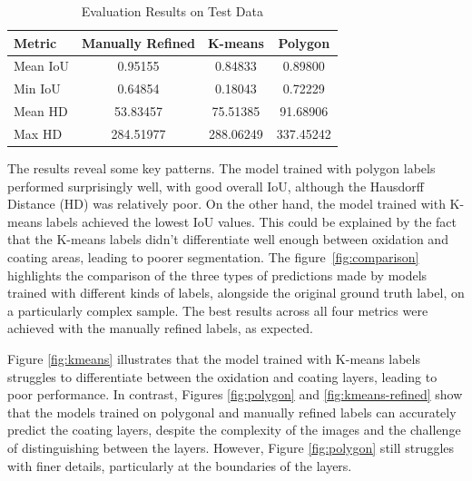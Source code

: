 \begin{table}[H]
    \centering
    \caption{Evaluation Results on Test Data}
    \renewcommand{\arraystretch}{1.2}
    
    \begin{tabular}{lccc}
        \toprule
        \textbf{Metric} & \textbf{Manually Refined} & \textbf{K-means} & \textbf{Polygon} \\
        \midrule
        Mean IoU & 0.95155 & 0.84833 & 0.89800 \\
        Min IoU  & 0.64854 & 0.18043 & 0.72229 \\
        Mean HD  & 53.83457 & 75.51385 & 91.68906 \\
        Max HD  & 284.51977 & 288.06249 & 337.45242 \\
        \bottomrule
    \end{tabular}
    \label{tab:test_results}
\end{table}


The results reveal some key patterns. The model trained with polygon labels performed surprisingly well, with good overall IoU, although the Hausdorff Distance (HD) was relatively poor. On the other hand, the model trained with K-means labels achieved the lowest IoU values. This could be explained by the fact that the K-means labels didn't differentiate well enough between oxidation and coating areas, leading to poorer segmentation. The figure~\ref{fig:comparison} highlights the comparison of the three types of predictions made by models trained with different kinds of labels, alongside the original ground truth label, on a particularly complex sample. The best results across all four metrics were achieved with the manually refined labels, as expected.


Figure \ref{fig:kmeans} illustrates that the model trained with K-means labels struggles to differentiate between the oxidation and coating layers, leading to poor performance. In contrast, Figures \ref{fig:polygon} and \ref{fig:kmeans-refined} show that the models trained on polygonal and manually refined labels can accurately predict the coating layers, despite the complexity of the images and the challenge of distinguishing between the layers. However, Figure \ref{fig:polygon} still struggles with finer details, particularly at the boundaries of the layers.


